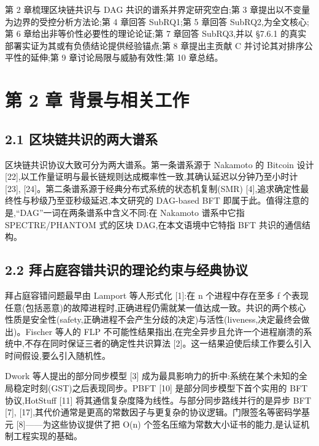 \documentclass[UTF8,fontset=windows,a4paper,11pt]{ctexart}
\begin{document}
第 2 章梳理区块链共识与 DAG 共识的谱系并界定研究空白;第 3
章提出以不变量为边界的受控分析方法论;第 4 章回答 SubRQ1;第 5 章回答
SubRQ2,为全文核心;第 6 章给出非等价性必要性的理论论证;第 7 章回答
SubRQ3,并以 §7.6.1 的真实部署实证为其或有负债结论提供经验锚点;第 8
章提出主贡献 C 并讨论其对排序公平性的延伸;第 9 章讨论局限与威胁有效性;第
10 章总结。

\section{第 2 章
背景与相关工作}\label{ux7b2c-2-ux7ae0-ux80ccux666fux4e0eux76f8ux5173ux5de5ux4f5c}

\subsection{2.1
区块链共识的两大谱系}\label{ux533aux5757ux94feux5171ux8bc6ux7684ux4e24ux5927ux8c31ux7cfb}

区块链共识协议大致可分为两大谱系。第一条谱系源于 Nakamoto 的 Bitcoin
设计 {[}22{]},以工作量证明与最长链规则达成概率性一致,其确认延迟以分钟乃至小时计 {[}23{]}, {[}24{]}。第二条谱系源于经典分布式系统的状态机复制(SMR) {[}4{]},追求确定性最终性与秒级乃至亚秒级延迟,本文研究的 DAG-based BFT 即属于此。值得注意的是,``DAG''一词在两条谱系中含义不同:在 Nakamoto 谱系中它指 SPECTRE/PHANTOM 式的区块 DAG,在本文语境中它特指 BFT 共识的通信结构。

\subsection{2.2
拜占庭容错共识的理论约束与经典协议}\label{ux62dcux5360ux5eadux5bb9ux9519ux5171ux8bc6ux7684ux7406ux8bbaux7ea6ux675fux4e0eux7ecfux5178ux534fux8bae}

拜占庭容错问题最早由 Lamport 等人形式化 {[}1{]}:在 n 个进程中存在至多 f
个表现任意(包括恶意)的故障进程时,正确进程仍需就某一值达成一致。共识的两个核心性质是安全性(safety,正确进程不会产生分歧的决定)与活性(liveness,决定最终会做出)。Fischer
等人的 FLP
不可能性结果指出,在完全异步且允许一个进程崩溃的系统中,不存在同时保证三者的确定性共识算法
{[}2{]}。这一结果迫使后续工作要么引入时间假设,要么引入随机性。

Dwork 等人提出的部分同步模型 {[}3{]}
成为最具影响力的折中:系统在某个未知的全局稳定时刻(GST)之后表现同步。PBFT
{[}10{]} 是部分同步模型下首个实用的 BFT 协议,HotStuff {[}11{]}
将其通信复杂度降为线性。与部分同步路线并行的是异步 BFT {[}7{]}, {[}17{]},其代价通常是更高的常数因子与更复杂的协议逻辑。门限签名等密码学基元 {[}8{]}------为这些协议提供了把 O(n)
个签名压缩为常数大小证书的能力,是认证机制工程实现的基础。
\end{document}
